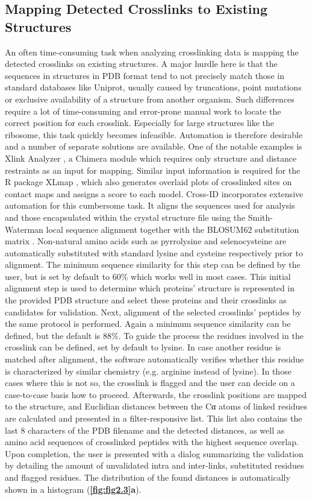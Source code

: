 \subsection{Mapping Detected Crosslinks to Existing Structures}
An often time-consuming task when analyzing crosslinking data is mapping the detected crosslinks on existing structures. A major hurdle here is that the sequences in structures in PDB format tend to not precisely match those in standard databases like Uniprot, usually caused by truncations, point mutations or exclusive availability of a structure from another organism. Such differences require a lot of time-consuming and error-prone manual work to locate the correct position for each crosslink. Especially for large structures like the ribosome, this task quickly becomes infeasible. Automation is therefore desirable and a number of separate solutions are available. One of the notable examples is Xlink Analyzer \cite{kosinski2015xlink}, a Chimera \cite{pettersen2004ucsf} module which requires only structure and distance restraints as an input for mapping. Similar input information is required for the R package XLmap \cite{schweppe2015xlmap:}, which also generates overlaid plots of crosslinked sites on contact maps and assigns a score to each model. Cross-ID incorporates extensive automation for this cumbersome task. It aligns the sequences used for analysis and those encapsulated within the crystal structure file using the Smith-Waterman local sequence alignment together with the BLOSUM62 substitution matrix \cite{henikoff1992amino}. Non-natural amino acids such as pyrrolysine and selenocysteine are automatically substituted with standard lysine and cysteine respectively prior to alignment. The minimum sequence similarity for this step can be defined by the user, but is set by default to 60\% which works well in most cases. This initial alignment step is used to determine which proteins’ structure is represented in the provided PDB structure and select these proteins and their crosslinks as candidates for validation. Next, alignment of the selected crosslinks’ peptides by the same protocol is performed. Again a minimum sequence similarity can be defined, but the default is 88\%. To guide the process the residues involved in the crosslink can be defined, set by default to lysine. In case another residue is matched after alignment, the software automatically verifies whether this residue is characterized by similar chemistry (e.g. arginine instead of lysine). In those cases where this is not so, the crosslink is flagged and the user can decide on a case-to-case basis how to proceed. Afterwards, the crosslink positions are mapped to the structure, and Euclidian distances between the Cα atoms of linked residues are calculated and presented in a filter-responsive list. This list also contains the last 8 characters of the PDB filename and the detected distances, as well as amino acid sequences of crosslinked peptides with the highest sequence overlap. Upon completion, the user is presented with a dialog summarizing the validation by detailing the amount of unvalidated intra and inter-links, substituted residues and flagged residues. The distribution of the found distances is automatically shown in a histogram (\textbf{\autoref{fig:fig2.3}a}).
